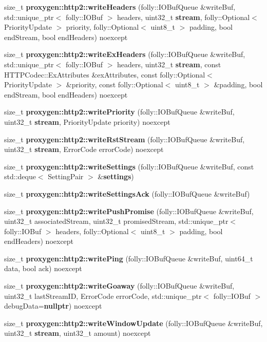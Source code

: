 \begin{DoxyCompactItemize}
\item 
size\+\_\+t {\bf proxygen\+::http2\+::write\+Headers} (folly\+::\+I\+O\+Buf\+Queue \&write\+Buf, std\+::unique\+\_\+ptr$<$ folly\+::\+I\+O\+Buf $>$ headers, uint32\+\_\+t {\bf stream}, folly\+::\+Optional$<$ Priority\+Update $>$ priority, folly\+::\+Optional$<$ uint8\+\_\+t $>$ padding, bool end\+Stream, bool end\+Headers) noexcept
\item 
size\+\_\+t {\bf proxygen\+::http2\+::write\+Ex\+Headers} (folly\+::\+I\+O\+Buf\+Queue \&write\+Buf, std\+::unique\+\_\+ptr$<$ folly\+::\+I\+O\+Buf $>$ headers, uint32\+\_\+t {\bf stream}, const H\+T\+T\+P\+Codec\+::\+Ex\+Attributes \&ex\+Attributes, const folly\+::\+Optional$<$ Priority\+Update $>$ \&priority, const folly\+::\+Optional$<$ uint8\+\_\+t $>$ \&padding, bool end\+Stream, bool end\+Headers) noexcept
\item 
size\+\_\+t {\bf proxygen\+::http2\+::write\+Priority} (folly\+::\+I\+O\+Buf\+Queue \&write\+Buf, uint32\+\_\+t {\bf stream}, Priority\+Update priority) noexcept
\item 
size\+\_\+t {\bf proxygen\+::http2\+::write\+Rst\+Stream} (folly\+::\+I\+O\+Buf\+Queue \&write\+Buf, uint32\+\_\+t {\bf stream}, Error\+Code error\+Code) noexcept
\item 
size\+\_\+t {\bf proxygen\+::http2\+::write\+Settings} (folly\+::\+I\+O\+Buf\+Queue \&write\+Buf, const std\+::deque$<$ Setting\+Pair $>$ \&{\bf settings})
\item 
size\+\_\+t {\bf proxygen\+::http2\+::write\+Settings\+Ack} (folly\+::\+I\+O\+Buf\+Queue \&write\+Buf)
\item 
size\+\_\+t {\bf proxygen\+::http2\+::write\+Push\+Promise} (folly\+::\+I\+O\+Buf\+Queue \&write\+Buf, uint32\+\_\+t associated\+Stream, uint32\+\_\+t promised\+Stream, std\+::unique\+\_\+ptr$<$ folly\+::\+I\+O\+Buf $>$ headers, folly\+::\+Optional$<$ uint8\+\_\+t $>$ padding, bool end\+Headers) noexcept
\item 
size\+\_\+t {\bf proxygen\+::http2\+::write\+Ping} (folly\+::\+I\+O\+Buf\+Queue \&write\+Buf, uint64\+\_\+t data, bool ack) noexcept
\item 
size\+\_\+t {\bf proxygen\+::http2\+::write\+Goaway} (folly\+::\+I\+O\+Buf\+Queue \&write\+Buf, uint32\+\_\+t last\+Stream\+ID, Error\+Code error\+Code, std\+::unique\+\_\+ptr$<$ folly\+::\+I\+O\+Buf $>$ debug\+Data={\bf nullptr}) noexcept
\item 
size\+\_\+t {\bf proxygen\+::http2\+::write\+Window\+Update} (folly\+::\+I\+O\+Buf\+Queue \&write\+Buf, uint32\+\_\+t {\bf stream}, uint32\+\_\+t amount) noexcept

\end{DoxyCompactItemize}
